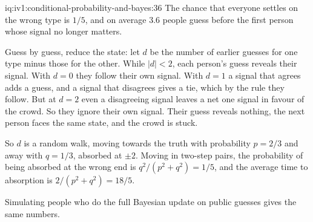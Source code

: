 \begin{solution}{iq:iv1:conditional-probability-and-bayes:36}
The chance that everyone settles on the wrong type is $1/5$, and on average $3.6$ people guess before the first person whose signal no longer matters.

Guess by guess, reduce the state: let $d$ be the number of earlier guesses for one type minus those for the other. While $|d| < 2$, each person's guess reveals their signal. With $d = 0$ they follow their own signal. With $d = 1$ a signal that agrees adds a guess, and a signal that disagrees gives a tie, which by the rule they follow. But at $d = 2$ even a disagreeing signal leaves a net one signal in favour of the crowd. So they ignore their own signal. Their guess reveals nothing, the next person faces the same state, and the crowd is stuck.

So $d$ is a random walk, moving towards the truth with probability $p = 2/3$ and away with $q = 1/3$, absorbed at $\pm 2$. Moving in two-step pairs, the probability of being absorbed at the wrong end is $q^2/(p^2 + q^2) = 1/5$, and the average time to absorption is $2/(p^2 + q^2) = 18/5$.

Simulating people who do the full Bayesian update on public guesses gives the same numbers.

\end{solution}

